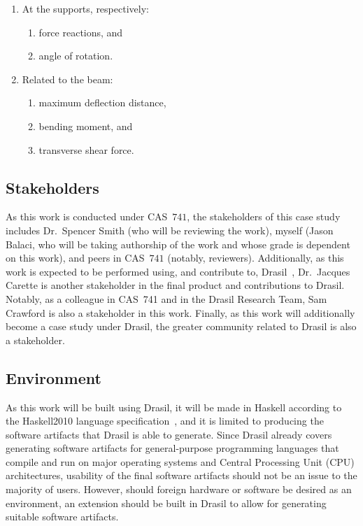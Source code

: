 \documentclass{article}
\begin{document}
\begin{enumerate}
    \item At the supports, respectively:
          \begin{enumerate}
              \item force reactions, and
              \item angle of rotation.
          \end{enumerate}

    \item Related to the beam:
          \begin{enumerate}
              \item maximum deflection distance,
              \item bending moment, and
              \item transverse shear force.
          \end{enumerate}
\end{enumerate}

\subsection{Stakeholders}
\label{problem-statement:stakeholders}

As this work is conducted under CAS\ $741$, the stakeholders of this case study
includes Dr.\ Spencer Smith (who will be reviewing the work), myself (Jason
Balaci, who will be taking authorship of the work and whose grade is dependent
on this work), and peers in CAS\ $741$ (notably, reviewers). Additionally, as
this work is expected to be performed using, and contribute to, Drasil\
\cite{Drasil2023}, Dr.\ Jacques Carette is another stakeholder in the final
product and contributions to Drasil. Notably, as a colleague in CAS\ 741 and in
the Drasil Research Team, Sam Crawford is also a stakeholder in this work.
Finally, as this work will additionally become a case study under Drasil, the
greater community related to Drasil is also a stakeholder.

\subsection{Environment}
\label{problem-statement:environment}

As this work will be built using Drasil, it will be made in Haskell according to
the Haskell2010 language specification\ \cite{Haskell2010}, and it is limited to
producing the software artifacts that Drasil is able to generate. Since Drasil
already covers generating software artifacts for general-purpose programming
languages that compile and run on major operating systems and Central Processing
Unit (CPU) architectures, usability of the final software artifacts should not
be an issue to the majority of users. However, should foreign hardware or
software be desired as an environment, an extension should be built in Drasil to
allow for generating suitable software artifacts.
\end{document}

